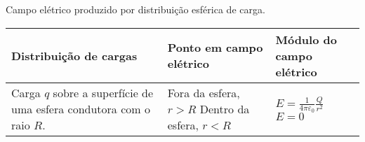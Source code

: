 \begin{quadro}[!htb]
    \centering
    \caption{Campo elétrico produzido por distribuição esférica de carga.\label{qua:quadro-exemplo1}}
    \begin{tabular}{|p{5cm}|p{4.8cm}|p{4.8cm}|}
        \hline
        \textbf{Distribuição de cargas} & \textbf{Ponto em campo elétrico} & \textbf{Módulo do campo elétrico} \\
        \hline
        Carga $q$ sobre a superfície de uma esfera condutora com o raio $R$. & 
        
        Fora da esfera, $r > R$ \newline \newline
        Dentro da esfera, $r < R$ & 
        
        $E = \frac{1}{4\pi\varepsilon_0} \frac{Q}{r^2}$ \newline \newline
        $E = 0$
        \\
        \hline
    \end{tabular}
\end{quadro}
